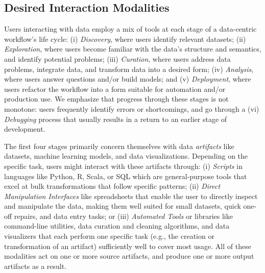 \subsection{Desired Interaction Modalities}

Users interacting with data employ a mix of tools at each stage of a data-centric workflow's life cycle:
(i) \textit{Discovery}, where users identify relevant datasets;
(ii) \textit{Exploration}, where users become familiar with the data's structure and semantics, and identify potential problems;
(iii) \textit{Curation}, where users address data problems, integrate data, and transform data into a desired form;
(iv) \textit{Analysis}, where users answer questions and/or build models; and
(v) \textit{Deployment}, where users refactor the workflow into a form suitable for automation and/or production use.
We emphasize that progress through these stages is not monotone: users frequently identify errors or shortcomings, and go through a (vi) \textit{Debugging} process that usually results in a return to an earlier stage of development.

The first four stages primarily concern themselves with data \emph{artifacts} like datasets, machine learning models, and data visualizations.
Depending on the specific task, users might interact with these artifacts through:
(i) \textit{Scripts} in languages like Python, R, Scala, or SQL which are general-purpose tools that excel at bulk transformations that follow specific patterns;
(ii) \textit{Direct Manipulation Interfaces} like spreadsheets that enable the user to directly inspect and manipulate the data, making them well suited for small datasets, quick one-off repairs, and data entry tasks; or
(iii) \textit{Automated Tools} or libraries like command-line utilities, data curation and cleaning algorithms, and data visualizers that each perform one specific task (e.g., the creation or transformation of an artifact) sufficiently well to cover most usage.
All of these modalities act on one or more source artifacts, and produce one or more output artifacts as a result.

